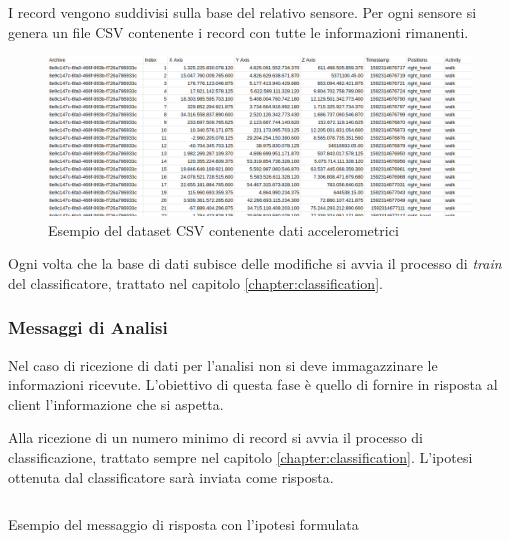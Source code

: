 \vspace{5mm} %
I record vengono suddivisi sulla base del relativo sensore. Per ogni sensore si genera un file CSV contenente i record con tutte 
le informazioni rimanenti.

\begin{figure}[H]
    \centering
    \includegraphics[scale = 0.39]{assets/images/examples/dataset-data-example.png}
    \caption{Esempio del dataset CSV contenente dati accelerometrici}
    \label{fig:example-dataset-csv-accelerometer}
\end{figure}

Ogni volta che la base di dati subisce delle modifiche si avvia il processo di \textit{train} del classificatore, 
trattato nel capitolo \ref{chapter:classification}.


\subsubsection{Messaggi di Analisi}
Nel caso di ricezione di dati per l'analisi non si deve immagazzinare le informazioni ricevute. 
L'obiettivo di questa fase è quello di fornire in risposta al client l'informazione che si aspetta.

Alla ricezione di un numero minimo di record si avvia il processo di classificazione, trattato sempre nel capitolo \ref{chapter:classification}.
L'ipotesi ottenuta dal classificatore sarà inviata come risposta.

\begin{listing}[H] 
    \inputminted[frame=single,framesep=10pt]{json}{assets/snippets/server/receiver/prediction.json}
    \caption{Esempio del messaggio di risposta con l'ipotesi formulata}
    \label{listing:example-message-prediction}
\end{listing}